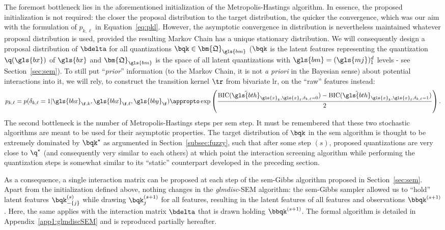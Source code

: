The foremost bottleneck lies in the aforementioned initialization of the Metropolis-Hastings algorithm. In essence, the proposed initialization is not required: the closer the proposal distribution to the target distribution, the quicker the convergence, which was our aim with the formulation of $p_{k,\ell}$ in Equation~\eqref{eq:pkl}. However, the asymptotic convergence in distribution is nevertheless maintained whatever proposal distribution is used, provided the resulting Markov Chain has a unique stationary distribution. We will consequently design a proposal distribution of $\bdelta$ for all quantizations $\bqk \in \bm{\mathfrak{Q}}_{\gls{bm}}$ ($\bqk$ is the latent features representing the quantization $\q(\gls{bx})$ of $\gls{bx}$ and $\bm{\mathfrak{Q}}_{\gls{bm}}$ is the space of all latent quantizations with $\gls{bm} = (\gls{mj})_1^d$ levels - see Section~\ref{sec:sem}). To still put ``\textit{prior}'' information (to the Markov Chain, it is not \textit{a priori} in the Bayesian sense) about potential interactions into it, we will rely, to construct the transition kernel $\tr$ from bivariate \gls{lr}, on the ``raw'' features instead:
\begin{equation} \label{eq:pklnew}
p_{k,\ell} = p(\delta_{k,\ell} = 1 | \gls{bbx}_{\f,k}, \gls{bbx}_{\f,\ell}, \gls{bby}_\f) \appropto \exp \left( \frac{\text{BIC}(\hat{\gls{bth}}_{\gls{x}_k,\gls{x}_\ell,\delta_{k,\ell}=0}) - \text{BIC}(\hat{\gls{bth}}_{\gls{x}_k,\gls{x}_\ell,\delta_{k,\ell}=1})}{2} \right).
\end{equation}
The second bottleneck is the number of Metropolis-Hastings steps per \gls{sem} step. It must be remembered that these two stochastic algorithms are meant to be used for their asymptotic properties. The target distribution of $\bqk$ in the \gls{sem} algorithm is thought to be extremely dominated by $\bqk^\star$ as argumented in Section~\ref{subsec:fuzzy}, such that after some step $(s)$, proposed quantizations are very close to $\q^\star$ (and consequently very similar to each others) at which point the interaction screening algorithm while performing the quantization steps is somewhat similar to its ``static'' counterpart developed in the preceding section.

As a consequence, a single interaction matrix can be proposed at each step of the \gls{sem}-Gibbs algorithm proposed in Section~\ref{sec:sem}. Apart from the initialization defined above, nothing changes in the \textit{glmdisc}-SEM algorithm: the \gls{sem}-Gibbs sampler allowed us to ``hold'' latent features $\bqk_{-\{j\}}^{(s)}$ while drawing $\bqk_{j}^{(s+1)}$ for all features, resulting in the latent features of all features and observations $\bbqk^{(s+1)}$. Here, the same applies with the interaction matrix $\bdelta$ that is drawn holding $\bbqk^{(s+1)}$. The formal algorithm is detailed in Appendix~\ref{app1:glmdiscSEM} and is reproduced partially hereafter.


